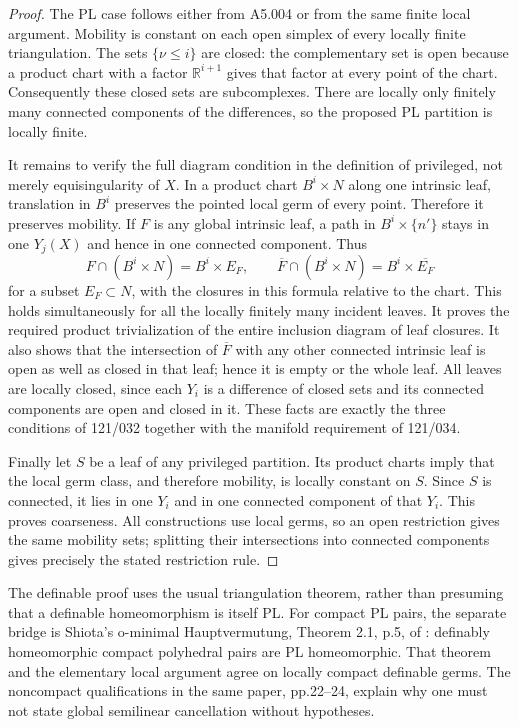 \begin{proof}
The PL case follows either from A5.004 or from the same finite local
argument.  Mobility is constant on each open simplex of every
locally finite triangulation.  The sets $\{\nu\leq i\}$ are closed:
the complementary set is open because a product chart with a factor
$\mathbb R^{i+1}$ gives that factor at every point of the chart.
Consequently these closed sets are subcomplexes.  There are locally
only finitely many connected components of the differences, so the
proposed PL partition is locally finite.

It remains to verify the full diagram condition in the definition
of privileged, not merely equisingularity of $X$.  In a product
chart $B^i\times N$ along one intrinsic leaf, translation in $B^i$
preserves the pointed local germ of every point.  Therefore it
preserves mobility.  If $F$ is any global intrinsic leaf, a path in
$B^i\times\{n'\}$ stays in one $Y_j(X)$ and hence in one connected
component.  Thus
\[
 F\cap(B^i\times N)=B^i\times E_F,
 \qquad
 \overline F\cap(B^i\times N)=B^i\times\overline{E_F}
\]
for a subset $E_F\subset N$, with the closures in this formula
relative to the chart.  This holds simultaneously for all the
locally finitely many incident leaves.  It proves the required
product trivialization of the entire inclusion diagram of leaf
closures.  It also shows that the intersection of $\overline F$
with any other connected intrinsic leaf is open as well as closed
in that leaf; hence it is empty or the whole leaf.  All leaves are
locally closed, since each $Y_i$ is a difference of closed sets and
its connected components are open and closed in it.  These facts
are exactly the three conditions of 121/032 together with the
manifold requirement of 121/034.

Finally let $S$ be a leaf of any privileged partition.  Its product
charts imply that the local germ class, and therefore mobility, is
locally constant on $S$.  Since $S$ is connected, it lies in one
$Y_i$ and in one connected component of that $Y_i$.  This proves
coarseness.  All constructions use local germs, so an open
restriction gives the same mobility sets; splitting their
intersections into connected components gives precisely the stated
restriction rule.
\end{proof}

The definable proof uses the usual triangulation theorem, rather
than presuming that a definable homeomorphism is itself PL.  For
compact PL pairs, the separate bridge is Shiota's o-minimal
Hauptvermutung, Theorem 2.1, p.5, of \cite{A5-Shiota}: definably
homeomorphic compact polyhedral pairs are PL homeomorphic.  That
theorem and the elementary local argument agree on locally compact
definable germs.  The noncompact qualifications in the same paper,
pp.22--24, explain why one must not state global semilinear
cancellation without hypotheses.

